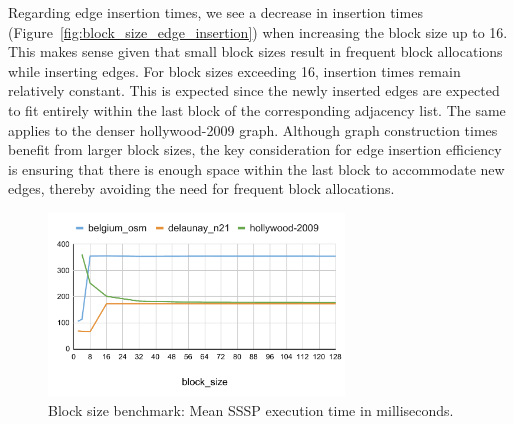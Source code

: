 Regarding edge insertion times, we see a decrease in insertion times (Figure~\ref{fig:block_size_edge_insertion}) when increasing the block size up to 16. This makes sense given that small block sizes result in frequent block allocations while inserting edges. For block sizes exceeding 16, insertion times remain relatively constant. This is expected since the newly inserted edges are expected to fit entirely within the last block of the corresponding adjacency list. The same applies to the denser hollywood-2009 graph. Although graph construction times benefit from larger block sizes, the key consideration for edge insertion efficiency is ensuring that there is enough space within the last block to accommodate new edges, thereby avoiding the need for frequent block allocations.

\begin{figure}
    \centering
    \includegraphics[width=0.7\textwidth]{Chapters/Figures/plots/block_size_sssp.pdf}
    \caption{Block size benchmark: Mean SSSP execution time in milliseconds.}
    \label{fig:block_size_edge_sssp}
\end{figure}

